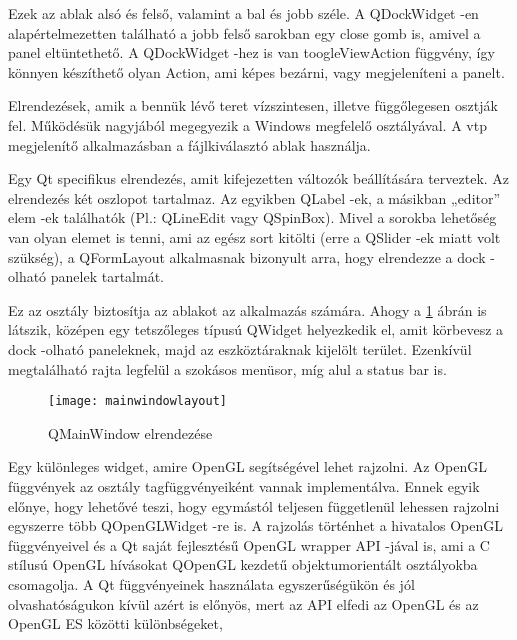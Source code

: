 \begin{sloppypar}
\begin{description}[font=\normalfont\itshape\bfseries\space]
Ezek az ablak alsó és felső, valamint a bal és jobb széle. 
A {\ttfamily QDockWidget} -en alapértelmezetten található a jobb felső sarokban 
egy close gomb is, amivel a panel eltüntethető. 
A {\ttfamily QDockWidget} -hez is van {\ttfamily toogleViewAction} függvény, 
így könnyen készíthető olyan Action, 
ami képes bezárni, vagy megjeleníteni a panelt.
\item [QHBoxLayout, QVBoxLayout:] 
Elrendezések, amik a bennük lévő teret vízszintesen, 
illetve függőlegesen osztják fel. 
Működésük nagyjából megegyezik a Windows megfelelő osztályával. 
A vtp megjelenítő alkalmazásban a fájlkiválasztó ablak használja.
\item [QFormLayout:] 
Egy Qt specifikus elrendezés, 
amit kifejezetten változók beállítására terveztek. 
Az elrendezés két oszlopot tartalmaz. 
Az egyikben {\ttfamily QLabel} -ek, 
a másikban „editor” elem -ek találhatók 
(Pl.: {\ttfamily QLineEdit} vagy {\ttfamily QSpinBox}). 
Mivel a sorokba lehetőség van olyan elemet is tenni, 
ami az egész sort kitölti (erre a {\ttfamily QSlider} -ek miatt volt szükség), 
a {\ttfamily QFormLayout} alkalmasnak bizonyult arra, 
hogy elrendezze a dock -olható panelek tartalmát.
\item [QMainWindow:] 
Ez az osztály biztosítja az ablakot az alkalmazás számára. 
Ahogy a \ref{fig:x mainWindowsLayout} ábrán is látszik, 
középen egy tetszőleges típusú QWidget helyezkedik el, 
amit körbevesz a dock -olható paneleknek, 
majd az eszköztáraknak kijelölt terület. 
Ezenkívül megtalálható rajta legfelül a szokásos menüsor, 
míg alul a status bar is.
\par
\begin{figure}[ht]
\centering
\texttt{[image: mainwindowlayout]}
\caption{QMainWindow elrendezése \cite{mainwindowlayout}}
\label{fig:x mainWindowsLayout}
\end{figure}
\par
\item [QOpenGLWidget:] 
Egy különleges widget, 
amire OpenGL segítségével lehet rajzolni. 
Az OpenGL függvények az osztály tagfüggvényeiként vannak implementálva. 
Ennek egyik előnye, 
hogy lehetővé teszi, 
hogy egymástól teljesen függetlenül
lehessen rajzolni egyszerre több 
QOpenGLWidget -re is.
A rajzolás történhet a hivatalos OpenGL függvényeivel
és a Qt saját fejlesztésű OpenGL wrapper API -jával is,
ami a C stílusú OpenGL hívásokat 
QOpenGL kezdetű objektumorientált osztályokba csomagolja. 
A Qt függvényeinek használata egyszerűségükön 
és jól olvashatóságukon kívül azért is előnyös, 
mert az API elfedi az OpenGL és az OpenGL ES közötti különbségeket, 

\end{description}
\end{sloppypar}
